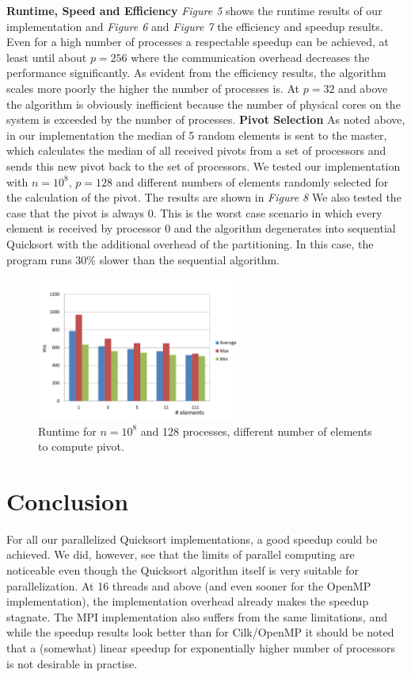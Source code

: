 \documentclass[12pt,a4paper]{article}
\begin{document}
\noindent\textbf{Runtime, Speed and Efficiency}\newline
\emph{Figure 5} shows the runtime results of our implementation and \emph{Figure 6} and \emph{Figure 7} the efficiency and speedup results. Even for a high number of processes a respectable speedup can be achieved, at least until about $p=256$ where the communication overhead decreases the performance significantly. As evident from the efficiency results, the algorithm scales more poorly the higher the number of processes is. At $p=32$ and above the algorithm is obviously inefficient because the number of physical cores on the system is exceeded by the number of processes.
\newline\newline
\textbf{Pivot Selection}\newline
As noted above, in our implementation the median of 5 random elements is sent to the master, which calculates the median of all received pivots from a set of processors and sends this new pivot back to the set of processors. We tested our implementation with $n=10^{8}$, $p=128$ and different numbers of elements randomly selected for the calculation of the pivot. The results are shown in \emph{Figure 8} We also tested the case that the pivot is always 0. This is the worst case scenario in which every element is received by processor 0 and the algorithm degenerates into sequential Quicksort with the additional overhead of the partitioning. In this case, the program runs 30\% slower than the sequential algorithm.
\begin{figure}[h]
	\includegraphics[width=0.6\textwidth]{img/mpi_pivot.pdf}
	\caption{Runtime for $n=10^{8}$ and 128 processes, different number of elements to compute pivot.}
\end{figure}
\newline\newline

\section{Conclusion}

For all our parallelized Quicksort implementations, a good speedup could be achieved. We did, however, see that the limits of parallel computing are noticeable even though the Quicksort algorithm itself is very suitable for parallelization. At 16 threads and above (and even sooner for the OpenMP implementation), the implementation overhead already makes the speedup stagnate. The MPI implementation also suffers from the same limitations, and while the speedup results look better than for Cilk/OpenMP it should be noted that a (somewhat) linear speedup for exponentially higher number of processors is not desirable in practise.
\end{document}
